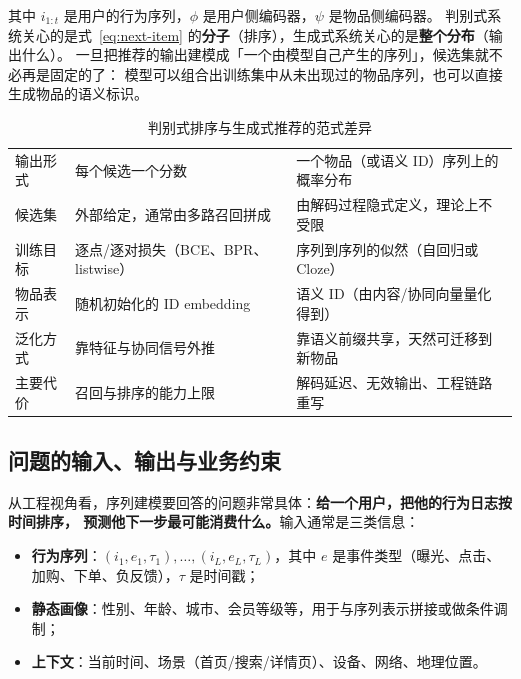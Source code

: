 其中 $i_{1:t}$ 是用户的行为序列，$\phi$ 是用户侧编码器，$\psi$ 是物品侧编码器。
判别式系统关心的是式~\eqref{eq:next-item} 的\textbf{分子}（排序），生成式系统关心的是\textbf{整个分布}（输出什么）。
一旦把推荐的输出建模成「一个由模型自己产生的序列」，候选集就不必再是固定的了：
模型可以组合出训练集中从未出现过的物品序列，也可以直接生成物品的语义标识。

\begin{table}[htbp]
\centering
\caption{判别式排序与生成式推荐的范式差异}
\label{tab:disc-vs-gen}
\small
\begin{tabularx}{\textwidth}{L{2.4cm} L{4.4cm} Y}
\toprule
{} &  &  \\
\midrule
输出形式 & 每个候选一个分数 & 一个物品（或语义 ID）序列上的概率分布 \\
\addlinespace
候选集 & 外部给定，通常由多路召回拼成 & 由解码过程隐式定义，理论上不受限 \\
\addlinespace
训练目标 & 逐点/逐对损失（BCE、BPR、listwise） & 序列到序列的似然（自回归或 Cloze） \\
\addlinespace
物品表示 & 随机初始化的 ID embedding & 语义 ID（由内容/协同向量量化得到） \\
\addlinespace
泛化方式 & 靠特征与协同信号外推 & 靠语义前缀共享，天然可迁移到新物品 \\
\addlinespace
主要代价 & 召回与排序的能力上限 & 解码延迟、无效输出、工程链路重写 \\
\bottomrule
\end{tabularx}
\end{table}

\subsection{问题的输入、输出与业务约束}

从工程视角看，序列建模要回答的问题非常具体：\textbf{给一个用户，把他的行为日志按时间排序，
预测他下一步最可能消费什么。}输入通常是三类信息：

\begin{itemize}
  \item \textbf{行为序列}：$(i_1, e_1, \tau_1), \dots, (i_L, e_L, \tau_L)$，其中 $e$ 是事件类型（曝光、点击、加购、下单、负反馈），$\tau$ 是时间戳；
  \item \textbf{静态画像}：性别、年龄、城市、会员等级等，用于与序列表示拼接或做条件调制；
  \item \textbf{上下文}：当前时间、场景（首页/搜索/详情页）、设备、网络、地理位置。
\end{itemize}

